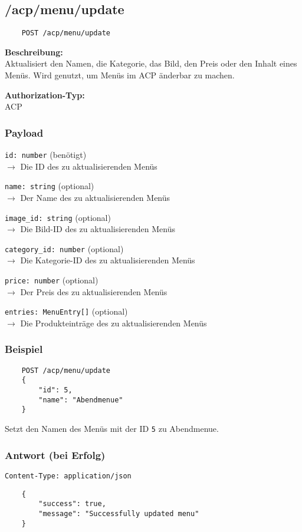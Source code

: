 \subsection{/acp/menu/update}

\begin{lstlisting}
    POST /acp/menu/update
\end{lstlisting}

\textbf{Beschreibung:} \\
Aktualisiert den Namen, die Kategorie, das Bild, den Preis oder den Inhalt eines Menüs. Wird genutzt, um Menüs im ACP änderbar zu machen.

\textbf{Authorization-Typ:} \\
ACP

\subsubsection{Payload}

\lstinline{id: number} (benötigt) \\
$\rightarrow$ Die ID des zu aktualisierenden Menüs

\lstinline{name: string} (optional) \\
$\rightarrow$ Der Name des zu aktualisierenden Menüs

\lstinline{image_id: string} (optional) \\
$\rightarrow$ Die Bild-ID des zu aktualisierenden Menüs

\lstinline{category_id: number} (optional) \\
$\rightarrow$ Die Kategorie-ID des zu aktualisierenden Menüs

\lstinline{price: number} (optional) \\
$\rightarrow$ Der Preis des zu aktualisierenden Menüs

\lstinline{entries: MenuEntry[]} (optional) \\
$\rightarrow$ Die Produkteinträge des zu aktualisierenden Menüs

\subsubsection{Beispiel}

\begin{lstlisting}
    POST /acp/menu/update
    {
        "id": 5,
        "name": "Abendmenue"
    }
\end{lstlisting}

Setzt den Namen des Menüs mit der ID \lstinline{5} zu \glqq Abendmenue\grqq.

\subsubsection{Antwort (bei Erfolg)}

\lstinline{Content-Type: application/json}
\begin{lstlisting}
    {
        "success": true, 
        "message": "Successfully updated menu"
    }
\end{lstlisting}